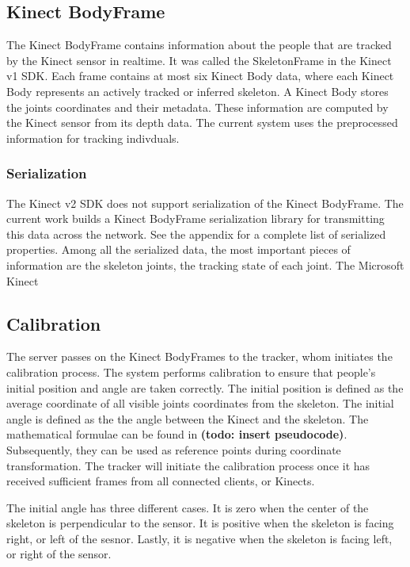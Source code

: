\documentclass{sigchi}
\begin{document}
\subsection{Kinect BodyFrame}

The Kinect BodyFrame contains information about the people that are tracked by the Kinect sensor in realtime. It was called the SkeletonFrame in the Kinect v1 SDK. Each frame contains at most six Kinect Body data, where each Kinect Body represents an actively tracked or inferred skeleton. A Kinect Body stores the joints coordinates and their metadata. These information are computed by the Kinect sensor from its depth data. The current system uses the preprocessed information for tracking indivduals.

\subsubsection{Serialization}

The Kinect v2 SDK does not support serialization of the Kinect BodyFrame. The current work builds a Kinect BodyFrame serialization library for transmitting this data across the network. See the appendix for a complete list of serialized properties. Among all the serialized data, the most important pieces of information are the skeleton joints, the tracking state of each joint. The Microsoft Kinect

\subsection{Calibration}

The server passes on the Kinect BodyFrames to the tracker, whom initiates the calibration process. The system performs calibration to ensure that people's initial position and angle are taken correctly. The initial position is defined as the average coordinate of all visible joints coordinates from the skeleton. The initial angle is defined as the the angle between the Kinect and the skeleton. The mathematical formulae can be found in \textbf{(todo: insert pseudocode)}. Subsequently, they can be used as reference points during coordinate transformation. The tracker will initiate the calibration process once it has received sufficient frames from all connected clients, or Kinects.

The initial angle \theta has three different cases. It is zero when the center of the skeleton is perpendicular to the sensor. It is positive when the skeleton is facing right, or left of the sesnor. Lastly, it is negative when the skeleton is facing left, or right of the sensor.
\end{document}

